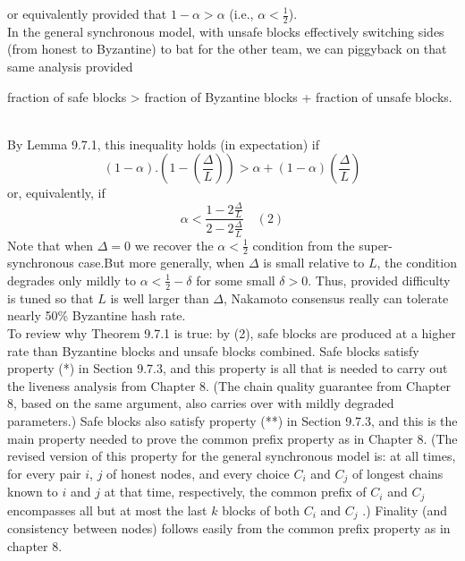 or equivalently provided that $1 - \alpha > \alpha$ (i.e., $\alpha < \frac{1}{2}$).\\

In the general synchronous model, with unsafe blocks effectively switching sides (from
honest to Byzantine) to bat for the other team, we can piggyback on that same analysis
provided
\begin{center}
    fraction of safe blocks > fraction of Byzantine blocks + fraction of unsafe blocks.
\end{center}\\
By Lemma 9.7.1, this inequality holds (in expectation) if
$$(1 - \alpha) . (1 - (\frac{\Delta}{L})) > \alpha + (1 - \alpha)(\frac{\Delta}{L}) $$
or, equivalently, if
$$\alpha < \frac{1 - 2\frac{\Delta}{L}}{2 - 2\frac{\Delta}{L}} \quad (2)$$
Note that when $\Delta = 0$ we recover the $\alpha < \frac{1}{2}$
condition from the super-synchronous case.But more generally, when $\Delta$ is small relative to $L$, the condition degrades only mildly to
$\alpha < \frac{1}{2} - \delta$ for some small $\delta > 0$. Thus, provided difficulty is tuned so that $L$ is well larger
than $\Delta$, Nakamoto consensus really can tolerate nearly 50\% Byzantine hash rate.\\

To review why Theorem 9.7.1 is true: by (2), safe blocks are produced at a higher rate than
Byzantine blocks and unsafe blocks combined. Safe blocks satisfy property (*) in Section 9.7.3,
and this property is all that is needed to carry out the liveness analysis from Chapter 8. (The chain quality guarantee from Chapter 8, based on the same argument, also carries over with mildly
degraded parameters.)
Safe blocks also satisfy property (**) in Section 9.7.3, and this is the main property needed
to prove the common prefix property as in Chapter 8. (The revised version of this property for the general synchronous model is: at all times, for every pair $i$, $j$
of honest nodes, and every choice $C_i$ and $C_j$ of longest chains known to $i$ and $j$ at that time, respectively,
the common prefix of $C_i$ and $C_j$ encompasses all but at most the last $k$ blocks of both $C_i$ and $C_j$ .) Finality (and consistency between
nodes) follows easily from the common prefix property as in chapter 8.\\

